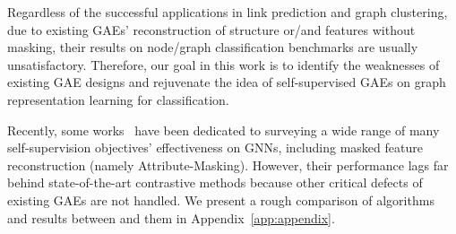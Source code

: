 Regardless of the successful applications in link prediction and graph clustering, 
due to existing GAEs' reconstruction of structure or/and features without masking, 
their results on node/graph classification benchmarks are usually unsatisfactory.
Therefore, 
our goal in this work is 
to identify the weaknesses of existing GAE designs and rejuvenate the idea of self-supervised GAEs on graph representation learning for classification.

Recently, some works~\cite{you2020does,manessi2021graph,zhu2020self,jin2020self} have been dedicated to surveying a wide range of many self-supervision objectives' effectiveness on GNNs, including masked feature reconstruction (namely Attribute-Masking).
However, their performance lags far behind state-of-the-art contrastive methods because other critical defects of existing GAEs are not handled. 
We present a rough comparison of algorithms and results between \model and them in Appendix~\ref{app:appendix}.